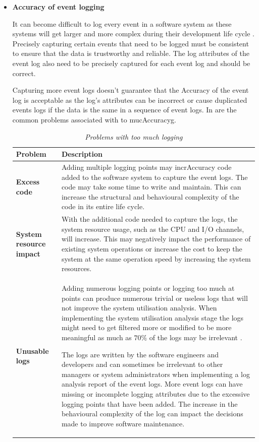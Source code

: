\clearpage

\begin{itemize}
	\item \textbf{Accuracy of event logging}\par It can become difficult to log every event in a software system as these systems will get larger and more complex during their development life cycle \cite{Stojanov2017}. Precisely capturing certain events that need to be logged must be consistent to ensure that the data is trustworthy and reliable. The log attributes of the event log also need to be precisely captured for each event log and should be correct.\par Capturing more event logs doesn't guarantee that the Accuracy of the event log is acceptable as the log's attributes can be incorrect or cause duplicated events logs if the data is the same in a sequence of event logs. In  are the common problems associated with to mucAccuracyg.

	\begin{table}[!htb]
		\centering
		\caption[Problems with too much logging]
		{\textit{Problems with too much logging \cite{Zhu2015}}}
		\label{tbl:ch1_loggingTooMuch}
		\begin{tabularx}{\linewidth}{|l|X|}
			\hline \textbf{Problem}  & \textbf{Description} \\
			\hline \textbf{Excess code} & Adding multiple logging points may incrAccuracy code added to the software system to capture the event logs. The code may take some time to write and maintain. This can increase the structural and behavioural complexity of the code in its entire life cycle. \\
			\hline \textbf{System resource impact} & With the additional code needed to capture the logs, the system resource usage, such as the CPU and I/O channels, will increase. This may negatively impact the performance of existing system operations or increase the cost to keep the system at the same operation speed by increasing the system resources.\\
			\hline \textbf{Unusable logs} & Adding numerous logging points or logging too much at points can produce numerous trivial or useless logs that will not improve the system utilisation analysis. When implementing the system utilisation analysis stage the logs might need to get filtered more or modified to be more meaningful as much as $70\%$ of the logs may be irrelevant \cite{Fedaghi2010}. \par The logs are written by the software engineers and developers and can sometimes be irrelevant to other managers or system administrators when implementing a log analysis report of the event logs. More event logs can have missing or incomplete logging attributes due to the excessive logging points that have been added. The increase in the behavioural complexity of the log can impact the decisions made to improve software maintenance. \\
			\hline
		\end{tabularx}
	\end{table}


\end{itemize}
